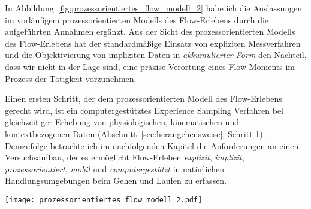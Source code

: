 In Abbildung~\ref{fig:prozessorientiertes_flow_modell_2} habe ich die Auslassungen im vorläufigem prozessorientierten Modells des Flow-Erlebens durch die aufgeführten Annahmen ergänzt. Aus der Sicht des prozessorientierten Modells des Flow-Erlebens hat der standardmäßige Einsatz von expliziten Messverfahren und die Objektivierung von impliziten Daten in \emph{akkumulierter Form} den Nachteil, dass wir nicht in der Lage sind, eine präzise Verortung eines Flow-Moments im Prozess der Tätigkeit vorzunehmen. 

Einen ersten Schritt, der dem prozessorientierten Modell des Flow-Erlebens gerecht wird, ist ein computergestütztes Experience Sampling Verfahren bei gleichzeitiger Erhebung von physiologischen, kinematischen und kontextbezogenen Daten (Abschnitt~\ref{sec:herangehensweise}, Schritt 1). Demzufolge betrachte ich im nachfolgenden Kapitel die Anforderungen an einen Versuchsaufbau, der es ermöglicht Flow-Erleben \emph{explizit}, \emph{implizit}, \emph{prozessorientiert}, \emph{mobil} und \emph{computergestützt} in natürlichen Handlungsumgebungen beim Gehen und Laufen zu erfassen.
\begin{sidewaysfigure}
	\texttt{[image: prozessorientiertes\_flow\_modell\_2.pdf]} \caption[Prozessorientiertes Modell des Flow-Erlebens (Erweiterung)]{Prozessorientiertes Modell mit Annahmen zu implizit messbaren Auswirkungen des Flow-Erlebens} \label{fig:prozessorientiertes_flow_modell_2} 
\end{sidewaysfigure}

